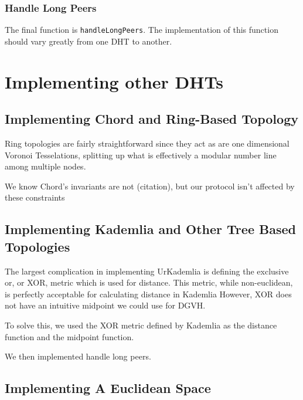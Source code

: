 \documentclass[11pt,conference]{IEEEtran}
\begin{document}
\subsubsection{Handle Long Peers}

The final function is \texttt{handleLongPeers}.
The implementation of this function should vary greatly from one DHT to another.







\section{Implementing other DHTs}
\label{sec:implement}
\subsection{Implementing Chord and Ring-Based Topology}

Ring topologies are fairly straightforward since they act as are one dimensional Voronoi Tesselations, splitting up what is effectively a modular number line among multiple nodes.

We know Chord's invariants are not (citation), but our protocol isn't affected by these constraints


\subsection{Implementing Kademlia and Other Tree Based Topologies}
The largest complication in implementing UrKademlia is defining the exclusive or, or XOR, metric which is used for distance.
This metric, while non-euclidean, is perfectly acceptable for calculating distance in Kademlia \cite{kademlia}
However, XOR does not have an intuitive midpoint we could use for DGVH.

To solve this, we used the XOR metric defined by Kademlia as the distance function and the midpoint function.



We then implemented handle long peers.

\subsection{Implementing A Euclidean Space}
\end{document}
